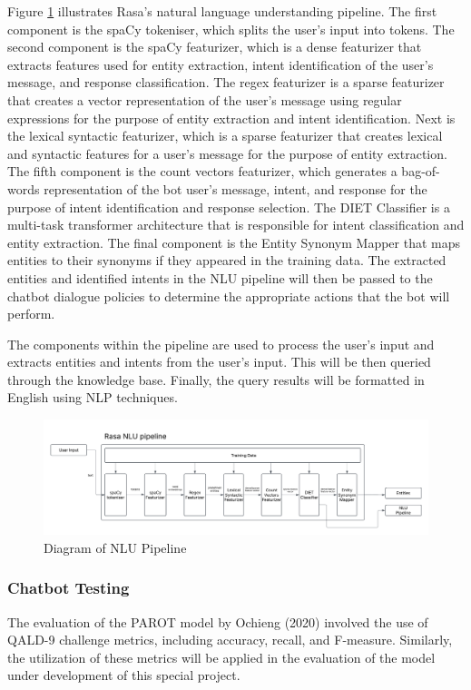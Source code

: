     Figure \ref{fig:nlu pipeline} illustrates Rasa's natural language understanding pipeline. The first component is the spaCy tokeniser, which splits the user's input into tokens. The second component is the spaCy featurizer, which is a dense featurizer that extracts features used for entity extraction, intent identification of the user's message, and response classification. The regex featurizer is a sparse featurizer that creates a vector representation of the user's message using regular expressions for the purpose of entity extraction and intent identification. Next is the lexical syntactic featurizer, which is a sparse featurizer that creates lexical and syntactic features for a user's message for the purpose of entity extraction. The fifth component is the count vectors featurizer, which generates a bag-of-words representation of the bot user's message, intent, and response for the purpose of intent identification and response selection. The DIET Classifier is a multi-task transformer architecture that is responsible for intent classification and entity extraction. The final component is the Entity Synonym Mapper that maps entities to their synonyms if they appeared in the training data. The extracted entities and identified intents in the NLU pipeline will then be passed to the chatbot dialogue policies to determine the appropriate actions that the bot will perform. 

    The components within the pipeline are used to process the user's input and extracts entities and intents from the user's input. This will be then queried through the knowledge base. Finally, the query results will be formatted in English using NLP techniques. 

\begin{figure}[H]
    \centering
    \includegraphics[width=\linewidth]{figures/NLU Pipeline.png}
    \caption{Diagram of NLU Pipeline}
    \label{fig:nlu pipeline}
\end{figure}

\subsubsection{Chatbot Testing}
    The evaluation of the PAROT model by Ochieng (2020) involved the use of QALD-9 challenge metrics, including accuracy, recall, and F-measure. Similarly, the utilization of these metrics will be applied in the evaluation of the model under development of this special project.

